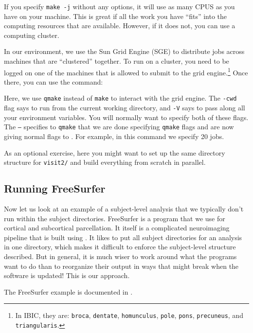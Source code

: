 If you specify \texttt{make -j} without any options, it will use as many CPUS as  you have on your machine. This is great if all the work you have ``fits'' into the computing resources that are available. However, if it does not, you can use a computing cluster.

In our environment, we use the Sun Grid Engine (SGE) to distribute
jobs across machines that are ``clustered'' together. To run on a
cluster, you need to be logged on one of the machines that is allowed
to submit to the grid engine.\footnote{In IBIC, they are:  \texttt{broca}, \texttt{dentate}, \texttt{homunculus}, \texttt{pole}, \texttt{pons}, \texttt{precuneus}, and \texttt{triangularis}.} Once there, you can use the command:

Here, we use \texttt{qmake} instead of \texttt{make} to interact with the grid engine. The \texttt{-cwd} flag says to run from the current working directory, and \texttt{-V} says to pass along all your environment variables. You will normally want to specify both of these flags. The \texttt{--} specifies to \texttt{qmake} that we are done specifying \texttt{qmake} flags and are now giving normal flags to \maken{}. For example, in this command we specify 20 jobs. 

As an optional exercise, here you might want to set up the same directory structure for \texttt{visit2/} and build everything from scratch in parallel.

\subsection{Running FreeSurfer}
Now let us look at an example of a subject-level analysis that we typically don't run within the subject directories. FreeSurfer \citep[see][]{Desikan2006968, Fischl01012004, Fischl2004S69} is a program that we use for cortical and subcortical parcellation. It itself is a complicated neuroimaging pipeline that is built using \maken{}. It likes to put all subject directories for an analysis in one directory, which makes it difficult to enforce the subject-level structure described. But in general, it is much wiser to work around what the programs want to do than to reorganize their output in ways that might break when the software is updated! This is our approach.

The FreeSurfer example is documented in . 

